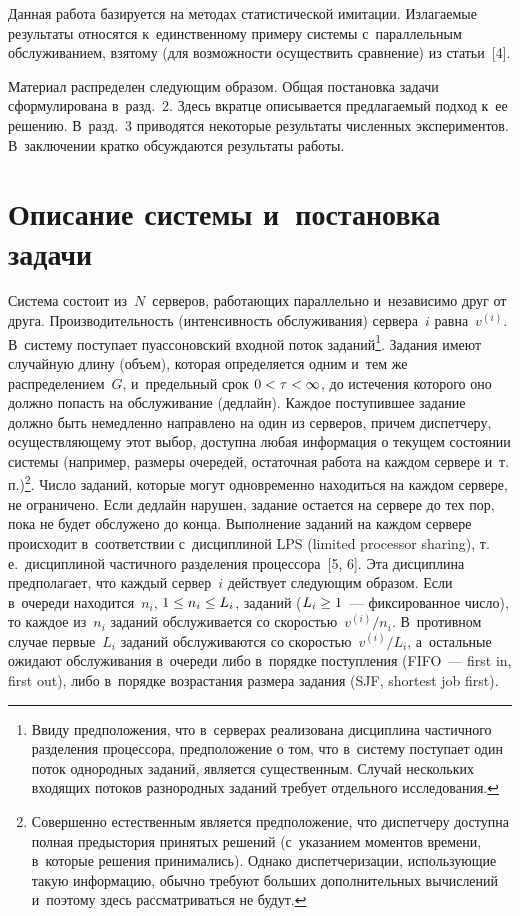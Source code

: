 \begin{multicols}{2}
   Данная работа базируется на методах ста\-ти\-стической имитации. 
Излагаемые результаты от\-носятся к~единственному примеру сис\-те\-мы 
с~параллельным обслуживанием, взятому (для \mbox{возможности} осуществить 
срав\-не\-ние) из \mbox{статьи}~[4]. 


Материал распределен следующим образом. Общая 
постановка задачи сформулирована в~разд.~2. Здесь вкратце описывается 
предлагаемый подход к~ее решению. В~разд.~3 приводятся некоторые 
результаты численных экспериментов. В~заключении кратко обсуждаются 
результаты работы.
   
\section{Описание системы и~постановка задачи}

   Система состоит из~$N$~серверов, работающих параллельно и~независимо 
друг от друга. Производительность (интенсивность обслуживания) сервера~$i$ 
равна~$v^{(i)}$. В~систему поступает пуассоновский входной поток 
заданий\footnote{Ввиду предположения, что в~серверах реализована дисциплина частичного 
разделения процессора, предположение о том, что в~систему поступает один поток однородных 
заданий, является существенным. Случай нескольких входящих потоков разнородных заданий 
требует отдельного исследования.}. Задания имеют случайную длину (объем), которая 
определяется одним и~тем же распределением~$G$, и~предельный срок $0\hm< 
\tau\hm<\infty$, до истечения которого оно должно попасть на обслуживание 
(дедлайн). Каждое поступившее задание должно быть немедленно направлено 
на один из серверов, причем диспетчеру, осуществляющему этот выбор, 
доступна любая информация о текущем состоянии системы (например, размеры 
очередей, остаточная работа на каждом сервере и~т.\,п.)\footnote{Совершенно 
естественным является предположение, что диспетчеру доступна полная предыстория принятых 
решений (с~указанием моментов времени, в~которые решения принимались). Однако 
диспетчеризации, использующие такую информацию, обычно требуют больших дополнительных 
вычислений и~поэтому здесь рассматриваться не будут.}. Число заданий, которые могут 
одновременно находиться на каждом сервере, не ограничено. Если дедлайн 
нарушен, задание остается на сервере до тех пор, пока не будет обслужено до 
конца. Выполнение заданий на каждом сервере происходит в~соответствии 
с~дисциплиной LPS (limited processor sharing), 
т.\,е.\ дисциплиной частичного разделения процессора~[5, 
6]. Эта дисциплина предполагает, что каждый сервер~$i$ действует следующим 
образом. Если в~очереди находится~$n_i$, $1\hm\leq n_i\hm\leq L_i$, заданий 
($L_i\hm\geq1$~--- фиксированное число), то каждое из~$n_i$ заданий 
обслуживается со ско\-ростью~$v^{(i)}/n_i$. В~противном случае первые~$L_i$ 
заданий обслуживаются со ско\-ростью~$v^{(i)}/L_i$, а~остальные ожидают 
обслуживания в~очереди либо в~порядке поступления (FIFO~--- first in, first out), 
либо в~порядке 
возрастания размера задания (SJF, shortest job first). 
  

\end{multicols}
